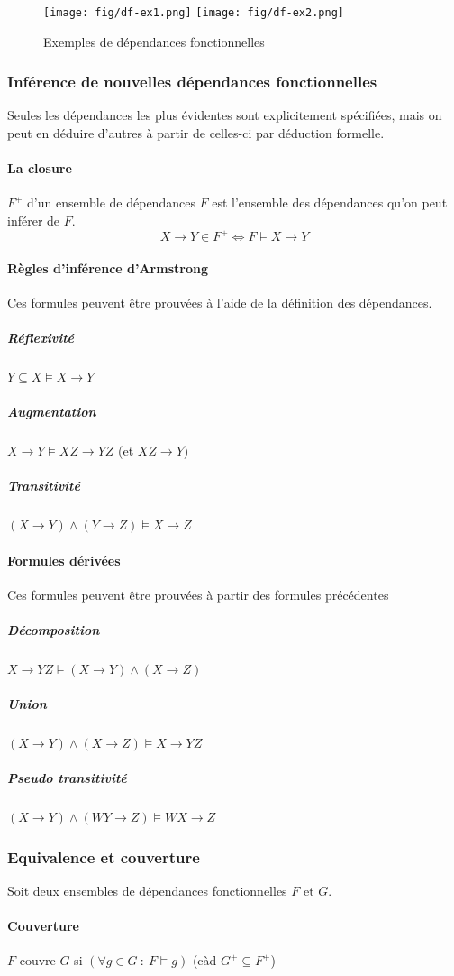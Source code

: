 \documentclass[a4paper]{article}
\begin{document}
\begin{figure}[H]
\center
\texttt{[image: fig/df-ex1.png]}
\texttt{[image: fig/df-ex2.png]}
\caption{Exemples de dépendances fonctionnelles}
\end{figure}

\subsubsection{Inférence de nouvelles dépendances fonctionnelles}
Seules les dépendances les plus évidentes sont explicitement spécifiées, mais on
peut en déduire d'autres à partir de celles-ci par déduction formelle.

\paragraph{La closure} $F^+$ d'un ensemble de dépendances $F$ est l'ensemble des
dépendances qu'on peut inférer de $F$.
$$ X \rightarrow Y \in F^+ \Leftrightarrow F \models X \rightarrow Y $$

\paragraph{Règles d'inférence d'Armstrong}
Ces formules peuvent être prouvées à l'aide de la définition des dépendances.
\subparagraph{Réflexivité} $ Y \subseteq X \models X \rightarrow Y $
\subparagraph{Augmentation} $ X \rightarrow Y \models XZ \rightarrow YZ $ (et $ XZ \rightarrow Y$)
\subparagraph{Transitivité} $ (X \rightarrow Y) \land (Y \rightarrow Z) \models X \rightarrow Z $

\paragraph{Formules dérivées}
Ces formules peuvent être prouvées à partir des formules précédentes
\subparagraph{Décomposition} $ X \rightarrow YZ \models (X \rightarrow Y) \land (X \rightarrow Z) $
\subparagraph{Union} $ (X \rightarrow Y) \land (X \rightarrow Z) \models X \rightarrow YZ $
\subparagraph{Pseudo transitivité} $ (X \rightarrow Y) \land (WY \rightarrow Z) \models WX \rightarrow Z $

\subsubsection{Equivalence et couverture}
Soit deux ensembles de dépendances fonctionnelles $F$ et $G$.
\paragraph{Couverture} $F$ couvre $G$ si $(\forall g \in G~:~F \models g)$ (càd $G^+ \subseteq F^+$)
\end{document}
